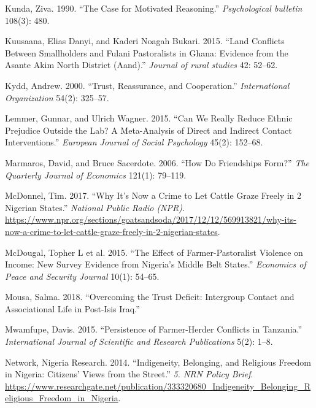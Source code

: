 \documentclass[11pt]{article}
\begin{document}
\leavevmode\hypertarget{ref-kunda1990motivatedReasoning}{}%
Kunda, Ziva. 1990. ``The Case for Motivated Reasoning.''
\emph{Psychological bulletin} 108(3): 480.

\leavevmode\hypertarget{ref-kuusaana2015land}{}%
Kuusaana, Elias Danyi, and Kaderi Noagah Bukari. 2015. ``Land Conflicts
Between Smallholders and Fulani Pastoralists in Ghana: Evidence from the
Asante Akim North District (Aand).'' \emph{Journal of rural studies} 42:
52--62.

\leavevmode\hypertarget{ref-kydd2000trust}{}%
Kydd, Andrew. 2000. ``Trust, Reassurance, and Cooperation.''
\emph{International Organization} 54(2): 325--57.

\leavevmode\hypertarget{ref-lemmer2015can}{}%
Lemmer, Gunnar, and Ulrich Wagner. 2015. ``Can We Really Reduce Ethnic
Prejudice Outside the Lab? A Meta-Analysis of Direct and Indirect
Contact Interventions.'' \emph{European Journal of Social Psychology}
45(2): 152--68.

\leavevmode\hypertarget{ref-marmaros2006friendships}{}%
Marmaros, David, and Bruce Sacerdote. 2006. ``How Do Friendships Form?''
\emph{The Quarterly Journal of Economics} 121(1): 79--119.

\leavevmode\hypertarget{ref-mcdonnel2017graze}{}%
McDonnel, Tim. 2017. ``Why It's Now a Crime to Let Cattle Graze Freely
in 2 Nigerian States.'' \emph{National Public Radio (NPR)}.
\url{https://www.npr.org/sections/goatsandsoda/2017/12/12/569913821/why-its-now-a-crime-to-let-cattle-graze-freely-in-2-nigerian-states}.

\leavevmode\hypertarget{ref-mcdougal2015effect}{}%
McDougal, Topher L et al. 2015. ``The Effect of Farmer-Pastoralist
Violence on Income: New Survey Evidence from Nigeria's Middle Belt
States.'' \emph{Economics of Peace and Security Journal} 10(1): 54--65.

\leavevmode\hypertarget{ref-mousa2018overcome}{}%
Mousa, Salma. 2018. ``Overcoming the Trust Deficit: Intergroup Contact
and Associational Life in Post-Isis Iraq.''

\leavevmode\hypertarget{ref-mwamfupe2015persistence}{}%
Mwamfupe, Davis. 2015. ``Persistence of Farmer-Herder Conflicts in
Tanzania.'' \emph{International Journal of Scientific and Research
Publications} 5(2): 1--8.

\leavevmode\hypertarget{ref-nigeria2014freedom}{}%
Network, Nigeria Research. 2014. ``Indigeneity, Belonging, and Religious
Freedom in Nigeria: Citizens' Views from the Street.'' \emph{5. NRN
Policy Brief}.
\url{https://www.researchgate.net/publication/333320680_Indigeneity_Belonging_Religious_Freedom_in_Nigeria}.
\end{document}
